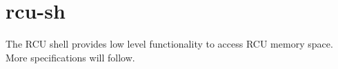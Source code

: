 \hypertarget{group__rcu__sh}{
\section{rcu-sh}
\label{group__rcu__sh}
}
The RCU shell provides low level functionality to access RCU memory space.  
More specifications will follow. 